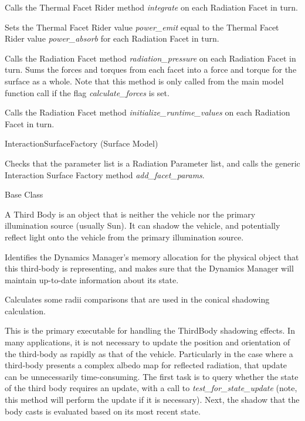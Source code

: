 {\begin{enumerate}
{\begin{enumerate}
Calls the Thermal Facet Rider method \textit{integrate} on each Radiation Facet
in turn.

Sets the Thermal Facet Rider value \textit{power\_emit} equal to the Thermal
Facet Rider value \textit{power\_absorb} for each Radiation Facet in turn.

\label{method:surfaceradiationpressure}
Calls the Radiation Facet method \textit{radiation\_pressure} on each Radiation
Facet in turn.  Sums the forces and torques from each facet into a force and
torque for the surface as a whole.  Note that this method is only called from
the main model function call if the flag \textit{calculate\_forces} is set.

Calls the Radiation Facet method \textit{initialize\_runtime\_values} on each
Radiation Facet in turn.

\end{enumerate}}


 InteractionSurfaceFactory (Surface Model)


{\begin{enumerate}

Checks that the parameter list is a Radiation Parameter list, and calls the
generic Interaction Surface Factory method \textit{add\_facet\_params}.
\end{enumerate}}


Base Class

A Third Body is an object that is neither the vehicle nor the primary
illumination source (usually Sun).  It can shadow the vehicle, and potentially
reflect light onto the vehicle from the primary illumination source.

{\begin{enumerate}

Identifies the Dynamics Manager's memory allocation for the physical object
that this third-body is representing, and makes sure that the Dynamics Manager
will maintain up-to-date information about its state.

Calculates some radii comparisons that are used in the conical shadowing
calculation.


This is the primary executable for handling the ThirdBody shadowing effects.  In many applications, it is not necessary to update the position and orientation of the third-body as rapidly as that of the vehicle.  Particularly in the case where a third-body presents a complex albedo map for reflected radiation, that update can be unnecessarily time-consuming.  The first task is to query whether the state of the third body requires an update, with a call to \textit{test\_for\_state\_update} (note, this method will perform the update if it is necessary).  Next, the shadow that the body casts is evaluated based on its most recent state.


\end{enumerate}}
\end{enumerate}}

